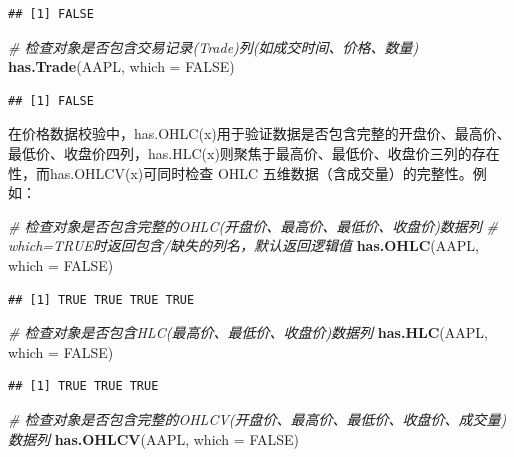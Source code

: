 \documentclass[]{ctexbook}
\newenvironment{Shaded}{\begin{snugshade}}{\end{snugshade}}
\newcommand{\AttributeTok}[1]{\textcolor[rgb]{0.13,0.29,0.53}{#1}}
\newcommand{\CommentTok}[1]{\textcolor[rgb]{0.56,0.35,0.01}{\textit{#1}}}
\newcommand{\ConstantTok}[1]{\textcolor[rgb]{0.56,0.35,0.01}{#1}}
\newcommand{\FunctionTok}[1]{\textcolor[rgb]{0.13,0.29,0.53}{\textbf{#1}}}
\newcommand{\NormalTok}[1]{#1}
\begin{document}
\begin{verbatim}
## [1] FALSE
\end{verbatim}

\begin{Shaded}
\begin{Highlighting}[]
\CommentTok{\# 检查对象是否包含交易记录(Trade)列(如成交时间、价格、数量)}
\FunctionTok{has.Trade}\NormalTok{(AAPL, }\AttributeTok{which =} \ConstantTok{FALSE}\NormalTok{)}
\end{Highlighting}
\end{Shaded}

\begin{verbatim}
## [1] FALSE
\end{verbatim}

在价格数据校验中，has.OHLC(x)用于验证数据是否包含完整的开盘价、最高价、最低价、收盘价四列，has.HLC(x)则聚焦于最高价、最低价、收盘价三列的存在性，而has.OHLCV(x)可同时检查 OHLC 五维数据（含成交量）的完整性。例如：

\begin{Shaded}
\begin{Highlighting}[]
\CommentTok{\# 检查对象是否包含完整的OHLC(开盘价、最高价、最低价、收盘价)数据列}
\CommentTok{\# which=TRUE时返回包含/缺失的列名，默认返回逻辑值}
\FunctionTok{has.OHLC}\NormalTok{(AAPL, }\AttributeTok{which =} \ConstantTok{FALSE}\NormalTok{)}
\end{Highlighting}
\end{Shaded}

\begin{verbatim}
## [1] TRUE TRUE TRUE TRUE
\end{verbatim}

\begin{Shaded}
\begin{Highlighting}[]
\CommentTok{\# 检查对象是否包含HLC(最高价、最低价、收盘价)数据列}
\FunctionTok{has.HLC}\NormalTok{(AAPL, }\AttributeTok{which =} \ConstantTok{FALSE}\NormalTok{)}
\end{Highlighting}
\end{Shaded}

\begin{verbatim}
## [1] TRUE TRUE TRUE
\end{verbatim}

\begin{Shaded}
\begin{Highlighting}[]
\CommentTok{\# 检查对象是否包含完整的OHLCV(开盘价、最高价、最低价、收盘价、成交量)数据列}
\FunctionTok{has.OHLCV}\NormalTok{(AAPL, }\AttributeTok{which =} \ConstantTok{FALSE}\NormalTok{)}
\end{Highlighting}
\end{Shaded}
\end{document}
